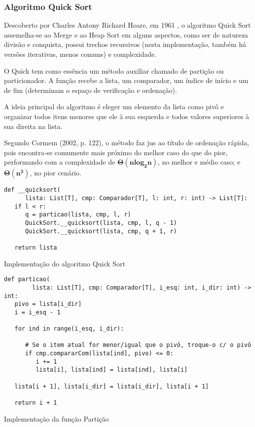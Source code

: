 \documentclass[a4paper,12pt]{scrartcl}
\begin{document}
\subsubsection{Algoritmo Quick Sort}
Descoberto por Charles Antony Richard Hoare, em 1961 \cite{hoare}, o algoritmo Quick Sort assemelha-se ao Merge e ao Heap Sort em alguns aspectos, como ser de natureza divisão e conquista, possui trechos recursivos (nesta implementação, também há versões iterativas, menos comuns) e complexidade.

O Quick tem como essência um método auxiliar chamado de partição ou particionador. A função  recebe a lista, um comparador, um índice de início e um de fim (determinam o espaço de verificação e ordenação).

A ideia principal do algoritmo é eleger um elemento da lista como pivô e organizar todos itens menores que ele à sua esquerda e todos valores superiores à sua direita na lista.

Segundo Cormem (2002, p. 122), o método faz jus ao título de ordenação rápida, pois encontra-se comumente mais próximo do melhor caso do que do pior, performando com a complexidade de $\pmb{\Theta(n log_2 n)}$, no melhor e médio caso; e $\pmb{\Theta(n^2)}$, no pior cenário.

\begin{listing}[H]
\begin{verbatim}
def __quicksort(
      lista: List[T], cmp: Comparador[T], l: int, r: int) -> List[T]:
   if l < r:
      q = particao(lista, cmp, l, r)
      QuickSort.__quicksort(lista, cmp, l, q - 1)
      QuickSort.__quicksort(lista, cmp, q + 1, r)

   return lista
\end{verbatim}
\caption{\footnotesize{Implementação do algoritmo Quick Sort}}
\end{listing}

\begin{listing}[H]
\begin{verbatim}
def particao(
        lista: List[T], cmp: Comparador[T], i_esq: int, i_dir: int) -> int:
   pivo = lista[i_dir]
   i = i_esq - 1

   for ind in range(i_esq, i_dir):

      # Se o item atual for menor/igual que o pivô, troque-o c/ o pivô
      if cmp.compararCom(lista[ind], pivo) <= 0:
         i += 1
         lista[i], lista[ind] = lista[ind], lista[i]

   lista[i + 1], lista[i_dir] = lista[i_dir], lista[i + 1]

   return i + 1
\end{verbatim}
\caption{\footnotesize{Implementação da função Partição}}
\end{listing}
\end{document}
